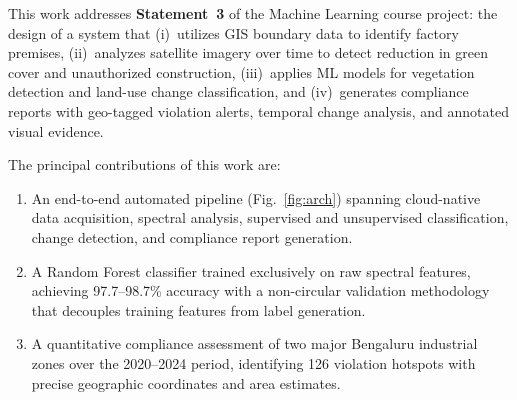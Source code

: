 \documentclass[conference,10pt]{IEEEtran}
\begin{document}
This work addresses \textbf{Statement~3} of the Machine Learning course project: the design of a system that (i)~utilizes GIS boundary data to identify factory premises, (ii)~analyzes satellite imagery over time to detect reduction in green cover and unauthorized construction, (iii)~applies ML models for vegetation detection and land-use change classification, and (iv)~generates compliance reports with geo-tagged violation alerts, temporal change analysis, and annotated visual evidence.

\smallskip
\noindent The principal contributions of this work are:
\begin{enumerate}
    \item An end-to-end automated pipeline (Fig.~\ref{fig:arch}) spanning cloud-native data acquisition, spectral analysis, supervised and unsupervised classification, change detection, and compliance report generation.
    \item A Random Forest classifier trained exclusively on raw spectral features, achieving 97.7--98.7\% accuracy with a non-circular validation methodology that decouples training features from label generation.
    \item A quantitative compliance assessment of two major Bengaluru industrial zones over the 2020--2024 period, identifying 126 violation hotspots with precise geographic coordinates and area estimates.
\end{enumerate}
\end{document}
